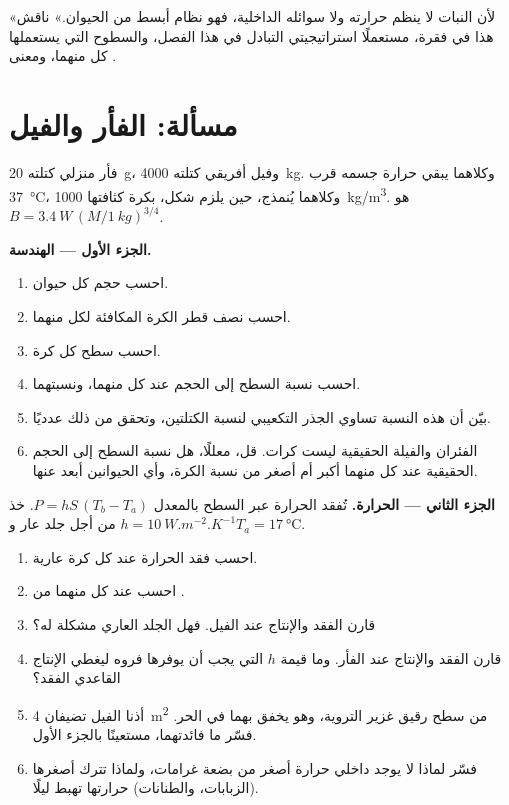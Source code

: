 \begin{exercise}[$\star\star\star$]\label{exo:b1:organism-environment:12}
«لأن النبات لا ينظم حرارته ولا سوائله الداخلية، فهو نظام أبسط من
الحيوان.» ناقش هذا في فقرة، مستعملًا استراتيجيتي التبادل في هذا
الفصل، والسطوح التي يستعملها كل منهما، ومعنى .
\end{exercise}

\section{مسألة: الفأر والفيل}

\begin{problem}
\label{pb:b1:organism-environment:1}
فأر منزلي كتلته \qty{20}{g}، وفيل أفريقي كتلته \qty{4000}{kg}. وكلاهما
يبقي حرارة جسمه قرب \qty{37}{\celsius}، وكلاهما يُنمذج، حين يلزم
شكل، بكرة كثافتها \qty{1000}{kg/m^3}.  هو
$B = \qty{3.4}{W}\,(M/\qty{1}{kg})^{3/4}$.

\medskip
\noindent\textbf{الجزء الأول --- الهندسة.}
\begin{enumerate}
  \item احسب حجم كل حيوان.
  \item احسب نصف قطر الكرة المكافئة لكل منهما.
  \item احسب سطح كل كرة.
  \item احسب نسبة السطح إلى الحجم عند كل منهما، ونسبتهما.
  \item بيّن أن هذه النسبة تساوي الجذر التكعيبي لنسبة الكتلتين،
        وتحقق من ذلك عدديًا.
  \item الفئران والفيلة الحقيقية ليست كرات. قل، معللًا، هل نسبة
        السطح إلى الحجم الحقيقية عند كل منهما أكبر أم أصغر من نسبة
        الكرة، وأي الحيوانين أبعد عنها.
\end{enumerate}

\medskip
\noindent\textbf{الجزء الثاني --- الحرارة.}
تُفقد الحرارة عبر السطح بالمعدل $P = hS\,(T_b - T_a)$. خذ
$h = \qty{10}{W.m^{-2}.K^{-1}}$ من أجل جلد عار و$T_a =
\qty{17}{\celsius}$.
\begin{enumerate}[resume]
  \item احسب فقد الحرارة عند كل كرة عارية.
  \item احسب  عند كل منهما من .
  \item قارن الفقد والإنتاج عند الفيل. فهل الجلد العاري مشكلة له؟
  \item قارن الفقد والإنتاج عند الفأر. وما قيمة $h$ التي يجب أن
        يوفرها فروه ليغطي الإنتاج القاعدي الفقد؟
  \item أذنا الفيل تضيفان \qty{4}{m^2} من سطح رقيق غزير التروية،
        وهو يخفق بهما في الحر. فسّر ما فائدتهما، مستعينًا بالجزء
        الأول.
  \item فسّر لماذا لا يوجد داخلي حرارة أصغر من بضعة غرامات، ولماذا
        تترك أصغرها (الزبابات، والطنانات) حرارتها تهبط ليلًا.
\end{enumerate}


\end{problem}
